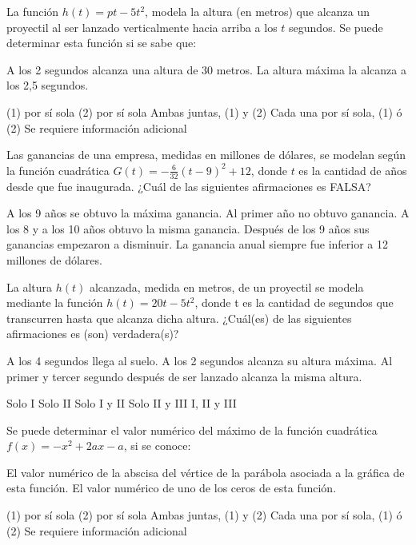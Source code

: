 \documentclass[sin nombre]{srs}
\begin{document}
\begin{preguntas}[after-item-skip=2cm]
\pregunta La función $h\left(t\right) = pt - 5t^{2}$, modela la altura (en metros) que alcanza un proyectil al ser lanzado verticalmente hacia arriba a los $t$ segundos. Se puede determinar esta función si se sabe que:
\begin{verticaln}
\alternativa A los 2 segundos alcanza una altura de 30 metros.
\alternativa La altura máxima la alcanza a los 2,5 segundos.
\end{verticaln}
\begin{vertical}
\alternativa (1) por sí sola
\alternativa (2) por sí sola
\alternativa Ambas juntas, (1) y (2)
\alternativa Cada una por sí sola, (1) ó (2)
\alternativa Se requiere información adicional
\end{vertical}

\pregunta Las ganancias de una empresa, medidas en millones de dólares, se modelan según la función cuadrática $G\left(t\right) = - \frac{6}{32}\left(t-9\right)^{2} + 12$, donde $t$ es la cantidad de años desde que fue inaugurada. ¿Cuál de las siguientes afirmaciones es FALSA?
\begin{vertical}
\alternativa A los 9 años se obtuvo la máxima ganancia.
\alternativa Al primer año no obtuvo ganancia.
\alternativa A los 8 y a los 10 años obtuvo la misma ganancia.
\alternativa Después de los 9 años sus ganancias empezaron a disminuir.
\alternativa La ganancia anual siempre fue inferior a 12 millones de dólares.
\end{vertical}

\pregunta La altura $h\left(t\right)$ alcanzada, medida en metros, de un proyectil se modela mediante la función $h\left(t\right) = 20t - 5t^{2}$, donde t es la cantidad de segundos que transcurren hasta que alcanza dicha altura. ¿Cuál(es) de las siguientes afirmaciones es (son) verdadera(s)?
\begin{verticali}
\alternativa A los 4 segundos llega al suelo.
\alternativa A los 2 segundos alcanza su altura máxima.
\alternativa Al primer y tercer segundo después de ser lanzado alcanza la misma altura.
\end{verticali}
\begin{vertical}
\alternativa Solo I
\alternativa Solo II
\alternativa Solo I y II
\alternativa Solo II y III
\alternativa I, II y III
\end{vertical}

\pregunta Se puede determinar el valor numérico del máximo de la función cuadrática $f\left(x\right) = -x^{2} + 2ax - a$, si se conoce:
\begin{verticaln}
\alternativa El valor numérico de la abscisa del vértice de la parábola asociada a la gráfica de esta función.
\alternativa El valor numérico de uno de los ceros de esta función.
\end{verticaln}
\begin{vertical}
\alternativa (1) por sí sola
\alternativa (2) por sí sola
\alternativa Ambas juntas, (1) y (2)
\alternativa Cada una por sí sola, (1) ó (2)
\alternativa Se requiere información adicional
\end{vertical}

\end{preguntas}
\end{document}
